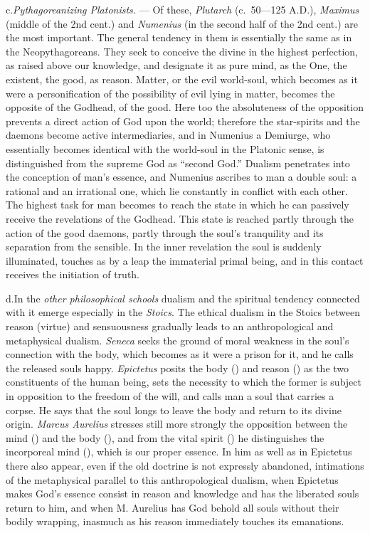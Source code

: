 \divrule

c.\enspace \emph{Pythagoreanizing Platonists.} --- Of these,
\emph{Plutarch} (c.\ 50---125 A.D.), \emph{Maximus} (middle of the 2nd
cent.) and \emph{Numenius} (in the second half of the 2nd cent.) are
the most important. The general tendency in them is essentially the
same as in the Neopythagoreans. They seek to conceive the divine in the
highest perfection, as raised above our knowledge, and designate it as
pure mind, as the One, the existent, the good, as reason. Matter, or the
evil world-soul, which becomes as it were a personification of the
possibility of evil lying in matter, becomes the opposite of the
Godhead, of the good. Here too the absoluteness of the
opposition prevents a direct action of God upon the world; therefore
the star-spirits and the daemons become active intermediaries, and in
Numenius a Demiurge, who essentially becomes identical with the
world-soul in the Platonic sense, is distinguished from the supreme God
as ``second God.''
Dualism penetrates into the conception of man's essence, and Numenius
ascribes to man a double soul: a rational and an irrational one, which
lie constantly in conflict with each other. The highest task for man
becomes to reach the state in which he can passively receive the
revelations of the Godhead.
This state is reached partly through the action of the good daemons,
partly through the soul's tranquility and its separation from the
sensible. In the inner revelation the soul is suddenly illuminated,
touches as by a leap the immaterial primal being, and in this contact
receives the initiation of truth.

\divrule

d.\enspace In the \emph{other philosophical schools} dualism and the
spiritual tendency connected with it emerge especially in the
\emph{Stoics}. The ethical dualism in the Stoics between reason (virtue)
and sensuousness gradually leads to an anthropological and metaphysical
dualism. \emph{Seneca} seeks the ground of moral weakness in the soul's
connection with the body, which becomes as it were a prison for it, and
he calls the released souls happy. \emph{Epictetus} posits the body
() and reason () as the two constituents of
the human being, sets the necessity to which the former is subject in
opposition to the freedom of the will, and calls man a soul that
carries a corpse. He says that the soul longs to leave the body and
return to its divine origin. \emph{Marcus Aurelius} stresses still more
strongly the opposition between the mind () and the
body (), and from the vital spirit () he
distinguishes the incorporeal mind (), which is our proper
essence.
In him as well as in Epictetus there also appear, even if the old
doctrine is not expressly abandoned, intimations of the
metaphysical parallel to this anthropological dualism, when Epictetus
makes God's essence consist in reason and knowledge and has the
liberated souls return to him, and when M. Aurelius has God behold all
souls without their bodily wrapping, inasmuch as his reason immediately
touches its emanations.


